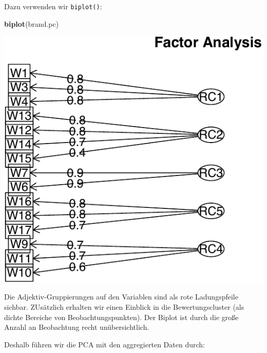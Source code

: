\documentclass[12pt,]{book}
\newenvironment{Shaded}{\begin{snugshade}}{\end{snugshade}}
\newcommand{\KeywordTok}[1]{\textcolor[rgb]{0.13,0.29,0.53}{\textbf{{#1}}}}
\newcommand{\NormalTok}[1]{{#1}}
\begin{document}
Dazu verwenden wir \texttt{biplot()}:

\begin{Shaded}
\begin{Highlighting}[]
\KeywordTok{biplot}\NormalTok{(brand.pc)}
\end{Highlighting}
\end{Shaded}

\begin{center}\includegraphics[width=0.7\linewidth]{083_Dimensionsreduktion_files/figure-latex/unnamed-chunk-14-1} \end{center}

Die Adjektiv-Gruppierungen auf den Variablen sind als rote Ladungspfeile
sichbar. ZUsätzlich erhalten wir einen Einblick in die Bewertungscluster
(als dichte Bereiche von Beobachtungspunkten). Der Biplot ist durch die
große Anzahl an Beobachtung recht unübersichtlich.

Deshalb führen wir die PCA mit den aggregierten Daten durch:
\end{document}
